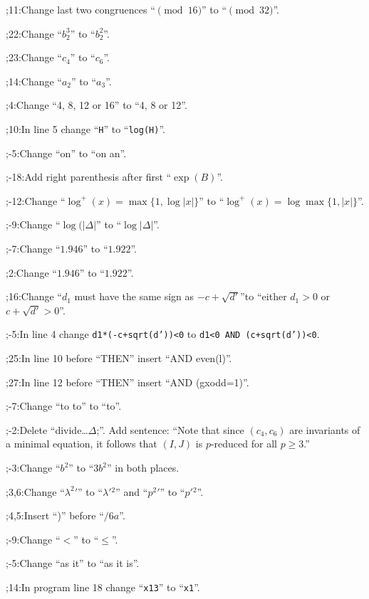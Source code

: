 %
%
;11:Change last two congruences ``$\pmod{16}$'' to ``$\pmod{32}$''.\par
{};22:Change ``$b_2^3$'' to ``$b_2^2$''.\par
{};23:Change ``$c_4$'' to ``$c_6$''.\par
{};14:Change ``$a_2$'' to ``$a_3$''.\par
{};4:Change ``4, 8, 12 or 16'' to ``4, 8 or 12''.\par
{};10:In line 5 change ``{\tt H}'' to ``{\tt log(H)}''.\par
{};-5:Change ``on'' to ``on an''.\par
{};-18:Add right parenthesis after first ``$\exp(B)$''.\par
{};-12:Change ``$\log^+(x)=\max\{1,\log|x|\}$'' to ``$\log^+(x)=\log\max\{1,|x|\}$''.\par
{};-9:Change ``$\log(|\Delta|$'' to ``$\log|\Delta|$''.\par
{};-7:Change ``$1.946$'' to ``$1.922$''.\par
{};2:Change ``$1.946$'' to ``$1.922$''.\par
{};16:Change ``$d_1$ must have the same sign as
$-c+\sqrt{d'}$''\hfill\break to ``either $d_1>0$ or $c+\sqrt{d'}>0$''.\par
{};-5:In line 4 change {\tt d1*(-c+sqrt(d'))<0} \hfill\break to
{\tt d1<0 AND (c+sqrt(d'))<0}.\par 
{};25:In line 10 before ``THEN'' insert ``AND even(l)''.\par
{};27:In line 12 before ``THEN'' insert ``AND (gxodd=1)''.\par
{};-7:Change ``to to'' to ``to''.\par
{};-2:Delete ``divide\dots $\Delta$;''.  Add sentence: ``Note that
since $(c_4,c_6)$ are invariants of a minimal equation, it follows
that $(I,J)$ is $p$-reduced for all $p\ge3$.''  \par
{};-3:Change ``$b^2$'' to ``$3b^2$'' in both places.\par
{};3,6:Change ``$\lambda^2{}'$'' to ``$\lambda'{}^2$'' and
``$p^2{}'$'' to ``$p'{}^2$''.\par
{};4,5:Insert ``)'' before ``$/6a$''.\par
{};-9:Change ``$<$'' to ``$\le$''.\par
{};-5:Change ``as it'' to ``as it is''.\par
{};14:In program line 18 change ``{\tt x13}'' to ``{\tt x1}''.\par
